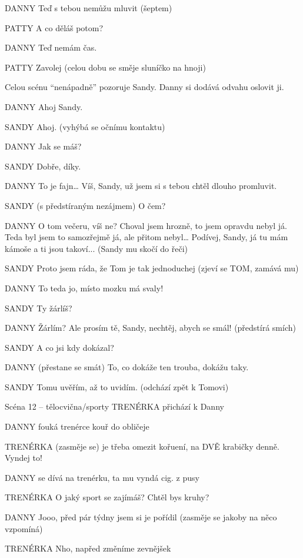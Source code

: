 DANNY        Teď s tebou nemůžu mluvit (šeptem) 

PATTY         A co děláš potom? 

DANNY         Teď nemám čas.

PATTY         Zavolej (celou dobu se směje sluníčko na hnoji) 

Celou scénu “nenápadně” pozoruje Sandy. Danny si dodává odvahu oslovit ji. 

DANNY         Ahoj Sandy.

SANDY        Ahoj. (vyhýbá se očnímu kontaktu) 

DANNY        Jak se máš? 

SANDY        Dobře, díky. 

DANNY        To je fajn… Víš, Sandy, už jsem si s tebou chtěl dlouho promluvit. 

SANDY         (s předstíraným nezájmem) O čem? 

DANNY         O tom večeru, víš ne? Choval jsem hrozně, to jsem opravdu nebyl já.         Teda byl jsem to samozřejmě já, ale přitom nebyl… Podívej, Sandy, já tu         mám kámoše a ti jsou takoví... (Sandy mu skočí do řeči) 

SANDY        Proto jsem ráda, že Tom je tak jednoduchej (zjeví se TOM, zamává  mu) 

DANNY         To teda jo, místo mozku má svaly! 

SANDY         Ty žárlíš? 

DANNY        Žárlím? Ale prosím tě, Sandy, nechtěj, abych se smál! (předstírá smích) 

SANDY         A co jsi kdy dokázal? 

DANNY         (přestane se smát) To, co dokáže ten trouba, dokážu taky. 

SANDY        Tomu uvěřím, až to uvidím. (odchází zpět k Tomovi) 

Scéna 12 – tělocvična/sporty TRENÉRKA        přichází k Danny 

DANNY        fouká trenérce kouř do obličeje

TRENÉRKA        (zasměje se) je třeba omezit kořuení, na DVĚ krabičky denně. Vyndej to!

DANNY        se dívá na trenérku, ta mu vyndá cig. z pusy 

TRENÉRKA        O jaký sport se zajímáš? Chtěl bys kruhy?

DANNY        Jooo, před pár týdny jsem si je pořídil (zasměje se jakoby na něco                 vzpomíná)

TRENÉRKA        Nho, napřed změníme zevnějšek

